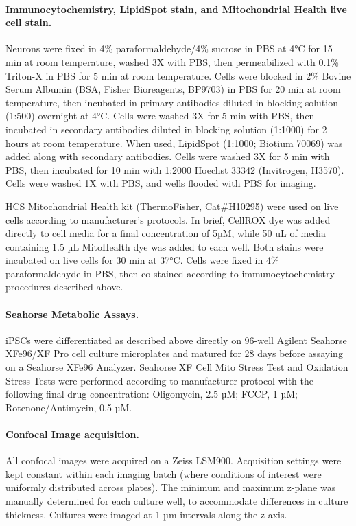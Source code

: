 \paragraph{Immunocytochemistry, LipidSpot stain, and Mitochondrial Health live cell stain.}
Neurons were fixed in 4\% paraformaldehyde/4\% sucrose in PBS at 4°C for 15 min at room temperature, washed 3X with PBS, then permeabilized with 0.1\% Triton-X in PBS for 5 min at room temperature. Cells were blocked in 2\% Bovine Serum Albumin (BSA, Fisher Bioreagents, BP9703) in PBS for 20 min at room temperature, then incubated in primary antibodies diluted in blocking solution (1:500) overnight at 4°C. Cells were washed 3X for 5 min with PBS, then incubated in secondary antibodies diluted in blocking solution (1:1000) for 2 hours at room temperature. When used, LipidSpot (1:1000; Biotium 70069) was added along with secondary antibodies. Cells were washed 3X for 5 min with PBS, then incubated for 10 min with 1:2000 Hoechst 33342 (Invitrogen, H3570). Cells were washed 1X with PBS, and wells flooded with PBS for imaging.

HCS Mitochondrial Health kit (ThermoFisher, Cat#H10295) were used on live cells according to manufacturer’s protocols. In brief, CellROX dye was added directly to cell media for a final concentration of 5µM, while 50 uL of media containing 1.5 µL MitoHealth dye was added to each well. Both stains were incubated on live cells for 30 min at 37°C. Cells were fixed in 4\% paraformaldehyde in PBS, then co-stained according to immunocytochemistry procedures described above.

\paragraph{Seahorse Metabolic Assays.}
iPSCs were differentiated as described above directly on 96-well Agilent Seahorse XFe96/XF Pro cell culture microplates and matured for 28 days before assaying on a Seahorse XFe96 Analyzer. Seahorse XF Cell Mito Stress Test and Oxidation Stress Tests were performed according to manufacturer protocol with the following final drug concentration: Oligomycin, 2.5 µM; FCCP, 1 µM; Rotenone/Antimycin, 0.5 µM. 

\paragraph{Confocal Image acquisition.}
All confocal images were acquired on a Zeiss LSM900. Acquisition settings were kept constant within each imaging batch (where conditions of interest were uniformly distributed across plates). The minimum and maximum z-plane was manually determined for each culture well, to accommodate differences in culture thickness. Cultures were imaged at 1 µm intervals along the z-axis.